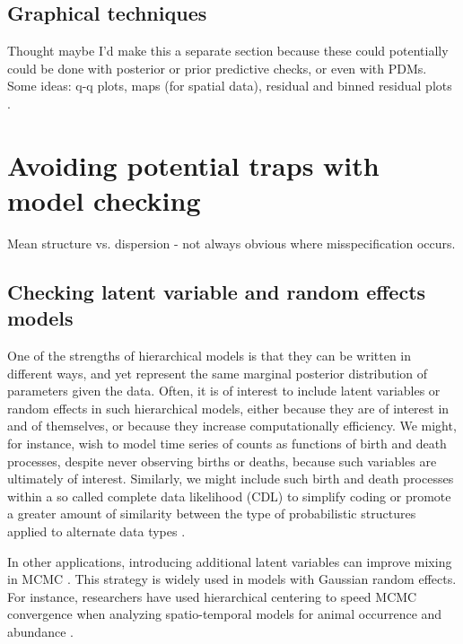 \documentclass[12pt,english]{article}
\begin{document}
\begin{spacing}{1.9}
\subsection{Graphical techniques}

Thought maybe I'd make this a separate section because these could potentially could be done with posterior or prior predictive checks, or even with PDMs.  Some ideas: q-q plots, maps (for spatial data), residual and binned residual plots \citep{GelmanEtAl2014}.




\section{Avoiding potential traps with model checking}

Mean structure vs. dispersion - not always obvious where misspecification occurs.

\subsection{Checking latent variable and random effects models}

One of the strengths of hierarchical models is that they can be written in different ways, and yet represent the same marginal posterior distribution of parameters given the data.  Often, it is of interest to include latent variables or random effects in such hierarchical models, either because they are of interest in and of themselves, or because they increase computationally efficiency.  We might, for instance, wish to model time series of counts as functions of birth and death processes, despite never observing births or deaths, because such variables are ultimately of interest.  Similarly, we might include such birth and death processes within a so called complete data likelihood (CDL) to simplify coding or promote a greater amount of similarity between the type of probabilistic structures applied to alternate data types \citep{Schofield2011}.

In other applications, introducing additional latent variables can improve mixing in MCMC \citep[as in hierarchical centering;][]{GelfandEtAl1995,RobertsSahu1997}. This strategy is widely used in models with Gaussian random effects.  For instance, researchers have used hierarchical centering to speed MCMC convergence when analyzing spatio-temporal models for animal occurrence and abundance \citep[see e.g.][]{JohnsonEtAl2013,ConnEtAl2015}.



\end{spacing}
\end{document}
